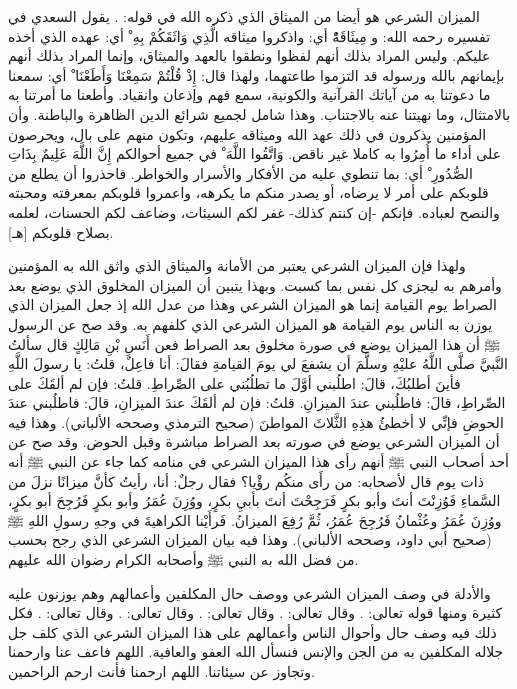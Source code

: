 الميزان الشرعي هو أيضا من الميثاق الذي ذكره الله في قوله:
\quranayah*[5][7]{\footnotesize \surahname*[5]}. يقول السعدي في تفسيره رحمه الله:
و { مِيثَاقَهُْ} أي: واذكروا ميثاقه { الَّذِي وَاثَقَكُمْ بِهِ ْ} أي: عهده الذي أخذه عليكم. وليس المراد بذلك أنهم لفظوا ونطقوا بالعهد والميثاق، وإنما المراد بذلك أنهم بإيمانهم بالله ورسوله قد التزموا طاعتهما، ولهذا قال: { إِذْ قُلْتُمْ سَمِعْنَا وَأَطَعْنَا ْ} أي: سمعنا ما دعوتنا به من آياتك القرآنية والكونية، سمع فهم وإذعان وانقياد. وأطعنا ما أمرتنا به بالامتثال، وما نهيتنا عنه بالاجتناب. وهذا شامل لجميع شرائع الدين الظاهرة والباطنة. وأن المؤمنين يذكرون في ذلك عهد الله وميثاقه عليهم، وتكون منهم على بال، ويحرصون على أداء ما أُمِرُوا به كاملا غير ناقص. { وَاتَّقُوا اللَّهَ ْ} في جميع أحوالكم { إِنَّ اللَّهَ عَلِيمٌ بِذَاتِ الصُّدُورِ ْ} أي: بما تنطوي عليه من الأفكار والأسرار والخواطر. فاحذروا أن يطلع من قلوبكم على أمر لا يرضاه، أو يصدر منكم ما يكرهه، واعمروا قلوبكم بمعرفته ومحبته والنصح لعباده. فإنكم -إن كنتم كذلك- غفر لكم السيئات، وضاعف لكم الحسنات، لعلمه بصلاح قلوبكم [هـ].

ولهذا فإن الميزان الشرعي يعتبر من الأمانة والميثاق الذي واثق الله به المؤمنين وأمرهم به ليجزى كل نفس بما كسبت. وبهذا يتبين أن الميزان المخلوق الذي يوضع بعد الصراط يوم القيامة إنما هو الميزان الشرعي وهذا من عدل الله إذ جعل الميزان الذي يوزن به الناس يوم القيامة هو الميزان الشرعي الذي كلفهم به. وقد صح عن الرسول ﷺ أن هذا الميزان يوضع في صورة مخلوق بعد الصراط فعن أَنَسِ بْنِ مَالِكٍ قال سألتُ النَّبيَّ صلَّى اللَّهُ عليْهِ وسلَّمَ أن يشفعَ لي يومَ القيامةِ فقالَ: أنا فاعِلٌ، قلتُ: يا رسولَ اللَّهِ فأينَ أطلبُكَ، قالَ: اطلُبني أوَّلَ ما تطلُبُني على الصِّراطِ. قلتُ: فإن لم ألقَكَ على الصِّراطِ، قالَ: فاطلُبني عندَ الميزانِ. قلتُ: فإن لم ألقَكَ عندَ الميزانِ، قالَ: فاطلُبني عندَ الحوضِ فإنِّي لا أخطئُ هذِهِ الثَّلاثَ المواطنَ {\footnotesize (صحيح الترمذي وصححه الألباني)}. وهذا فيه أن الميزان الشرعي يوضع في صورته بعد الصراط مباشرة وقبل الحوض. وقد صح عن أحد أصحاب النبي ﷺ أنهم رأى هذا الميزان الشرعي في منامه كما جاء عن النبي ﷺ أنه ذات يوم قال لأصحابه: من رأَى منكُم رؤْيا؟ فقال رجلٌ: أنا، رأيتُ كأنَّ ميزانًا نزلَ من السَّماءِ فَوُزِنْتَ أنتَ وأبو بكرٍ فَرَجِحْتَ أنتَ بأبيِ بكرٍ، ووُزِنَ عُمَرُ وأبو بكرٍ فَرُجِحَ أبو بكرٍ، ووُزِنَ عُمَرُ وعُثْمانُ فَرُجِحَ عُمَرُ، ثُمَّ رُفِعَ الميزانُ. فَرأَيْنا الكراهيةَ في وجهِ رسولِ اللهِ ﷺ {\footnotesize (صحيح أبي داود، وصححه الألباني)}. وهذا فيه بيان الميزان الشرعي الذي رجح بحسب من فضل الله به النبي ﷺ وأصحابه الكرام رضوان الله عليهم.

والأدلة في وصف الميزان الشرعي ووصف حال المكلفين وأعمالهم وهم يوزنون عليه كثيرة ومنها قوله تعالى:
\quranayah*[7][8-9]{\footnotesize \surahname*[7]}. وقال تعالى:
\quranayah*[18][105]{\footnotesize \surahname*[18]}. وقال تعالى:
\quranayah*[21][47]{\footnotesize \surahname*[21]}. وقال تعالى:
\quranayah*[23][102-103]{\footnotesize \surahname*[23]}. وقال تعالى:
\quranayah*[101][6-9]{\footnotesize \surahname*[101]}. فكل ذلك فيه وصف حال وأحوال الناس وأعمالهم على هذا الميزان الشرعي الذي كلف جل جلاله المكلفين به من الجن والإنس فنسأل الله العفو والعافية. اللهم فاعف عنا وارحمنا وتجاوز عن سيئاتنا. اللهم ارحمنا فأنت ارحم الراحمين.

